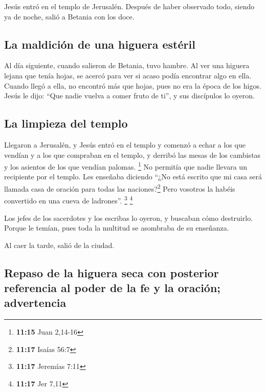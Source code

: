 \begin{paracol}{2}
 Jesús entró en el templo de Jerusalén. Después de haber
observado todo, siendo ya de noche, salió a Betania con los doce.

\hypertarget{la-maldiciuxf3n-de-una-higuera-estuxe9ril}{%
\subsection{La maldición de una higuera
estéril}\label{la-maldiciuxf3n-de-una-higuera-estuxe9ril}}

 Al día siguiente, cuando salieron de Betania, tuvo
hambre.  Al ver una higuera lejana que tenía hojas, se
acercó para ver si acaso podía encontrar algo en ella. Cuando llegó a
ella, no encontró más que hojas, pues no era la época de los higos.
 Jesús le dijo: ``Que nadie vuelva a comer fruto de ti'',
y sus discípulos lo oyeron.

\hypertarget{la-limpieza-del-templo}{%
\subsection{La limpieza del templo}\label{la-limpieza-del-templo}}

 Llegaron a Jerusalén, y Jesús entró en el templo y
comenzó a echar a los que vendían y a los que compraban en el templo, y
derribó las mesas de los cambistas y los asientos de los que vendían
palomas. \footnote{\textbf{11:15} Juan 2,14-16}  No
permitía que nadie llevara un recipiente por el templo. 
Les enseñaba diciendo ``¿No está escrito que mi casa será llamada casa
de oración para todas las naciones?\footnote{\textbf{11:17} Isaías 56:7}
Pero vosotros la habéis convertido en una cueva de ladrones''.
\footnote{\textbf{11:17} Jeremías 7:11} \footnote{\textbf{11:17} Jer
  7,11}

 Los jefes de los sacerdotes y los escribas lo oyeron, y
buscaban cómo destruirlo. Porque le temían, pues toda la multitud se
asombraba de su enseñanza.

 Al caer la tarde, salió de la ciudad.

\hypertarget{repaso-de-la-higuera-seca-con-posterior-referencia-al-poder-de-la-fe-y-la-oraciuxf3n-advertencia}{%
\subsection{Repaso de la higuera seca con posterior referencia al poder
de la fe y la oración;
advertencia}\label{repaso-de-la-higuera-seca-con-posterior-referencia-al-poder-de-la-fe-y-la-oraciuxf3n-advertencia}}


\end{paracol}
